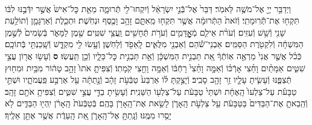 \documentclass[twoside, openany, parskip=half, 11pt]{book}
\begin{document}
\begin{footnotesize}
\begin{multicols}{2}
\\
וַיְדַבֵּ֥ר יְיָ֖ אֶל־מֹשֶׁ֥ה לֵּאמֹֽר׃ דַּבֵּר֙ אֶל־בְּֿֿנֵ֣י יִשְׂרָאֵ֔ל וְֿיִקְחוּ־לִ֖י תְּֿרוּמָ֑ה מֵאֵ֤ת כׇּל־אִישׁ֙ אֲשֶׁ֣ר יִדְּֿבֶ֣נּוּ לִבּ֔וֹ תִּקְח֖וּ אֶת־תְּֿֿרֽוּמָתִֽי׃ וְֿזֹאת֙ הַתְּֿרוּמָ֔ה אֲשֶׁ֥ר תִּקְח֖וּ מֵֽאִתָּ֑ם זָהָ֥ב וָכֶ֖סֶף וּנְחֹֽשֶׁת׃ וּתְכֵ֧לֶת וְֿאַרְגָּמָ֛ן וְֿתוֹלַ֥עַת שָׁנִ֖י וְֿשֵׁ֥שׁ וְֿעִזִּֽים׃ וְֿעֹרֹ֨ת אֵילִ֧ם מְֿאׇׇׇׇׇׇׇׇׇׇׇׇָדָּמִ֛ים וְֿעֹרֹ֥ת תְּֿחָשִׁ֖ים וַֽעֲצֵ֥י שִׁטִּֽים׃  שֶׁ֖מֶן לַמָּאֹ֑ר בְּֿשָׂמִים֙ לְֿשֶׁ֣מֶן הַמִּשְׁחָ֔ה וְֿלִקְטֹ֖רֶת הַסַּמִּֽים׃ אַבְנֵי־שֹׁ֕הַם וְֿאַבְנֵ֖י מִלֻּאִ֑ים לָֽאֵפֹ֖ד וְֿלַחֹֽשֶׁן׃ וְֿעָ֥שׂוּ לִ֖י מִקְדָּ֑שׁ וְֿשָֽׁכַנְתִּ֖י בְּֿתוֹכָֽם׃ כְּֿכֹ֗ל אֲשֶׁ֤ר אֲנִי֙ מַרְאֶ֣ה אֽוֹתְֿךָ֔ אֵ֚ת תַּבְנִ֣ית הַמִּשְׁכָּ֔ן וְֿאֵ֖ת תַּבְנִ֣ית כׇּל־כֵּלָ֑יו וְֿכֵ֖ן תַּֽעֲשֽׂוּ׃ \textbf{ס}  וְֿעָשׂ֥וּ אֲר֖וֹן עֲצֵ֣י שִׁטִּ֑ים אַמָּתַ֨יִם וָחֵ֜צִי אָרְֿכּ֗וֹ וְֿאַמָּ֤ה וָחֵ֨צִי֙ רָחְֿבּ֔וֹ וְֿאַמָּ֥ה וָחֵ֖צִי קֹֽמָתֽוֹ׃ וְֿצִפִּיתָ֤ אֹתוֹ֙ זָהָ֣ב טָה֔וֹר מִבַּ֥יִת וּמִח֖וּץ תְּֿצַפֶּ֑נּוּ וְֿעָשִׂ֧יתָ עָלָ֛יו זֵ֥ר זָהָ֖ב סָבִֽיב׃ וְֿיָצַ֣קְתָּ לּ֗וֹ אַרְבַּע֙ טַבְּֿעֹ֣ת זָהָ֔ב וְֿנָ֣תַתָּ֔ה עַ֖ל אַרְבַּ֣ע פַּֽעֲמֹתָ֑יו וּשְׁתֵּ֣י טַבָּעֹ֗ת עַל־צַלְעוֹ֙ הָֽאֶחָ֔ת וּשְׁתֵּי֙ טַבָּעֹ֔ת עַל־צַלְע֖וֹ הַשֵּׁנִֽית׃ וְֿעָשִׂ֥יתָ בַדֵּ֖י עֲצֵ֣י שִׁטִּ֑ים וְֿצִפִּיתָ֥ אֹתָ֖ם זָהָֽב׃ וְֿהֵֽבֵאתָ֤ אֶת־הַבַּדִּים֙ בַּטַּבָּעֹ֔ת עַ֖ל צַלְעֹ֣ת הָֽאָרֹ֑ן לָשֵׂ֥את אֶת־הָֽאָרֹ֖ן בָּהֶֽם׃ בְּֿטַבְּֿעֹת֙ הָֽאָרֹ֔ן יִֽהְי֖וּ הַבַּדִּ֑ים לֹ֥א יָסֻ֖רוּ מִמֶּֽנּוּ׃ וְֿנָֽתַתָּ֖ אֶל־הָֽאָרֹ֑ן אֵ֚ת הָֽעֵדֻ֔ת אֲשֶׁ֥ר אֶתֵּ֖ן אֵלֶֽיךָ׃


\end{multicols}
\end{footnotesize}
\end{document}
